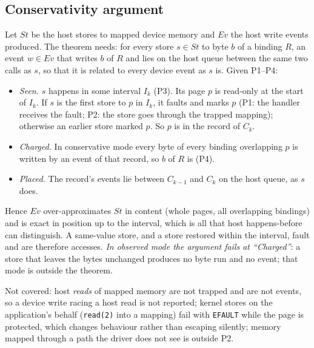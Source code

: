 \documentclass[acmtog,anonymous,review]{acmart}
\newcommand{\code}[1]{\texttt{#1}}
\begin{document}
\subsection{Conservativity argument}
Let $\mathit{St}$ be the host stores to mapped device memory and $\mathit{Ev}$ the host write events produced. The
theorem needs: for every store $s \in \mathit{St}$ to byte $b$ of a binding $R$, an event $w \in \mathit{Ev}$ that writes
$b$ of $R$ and lies on the host queue between the same two calls as $s$, so that it is related to every device event as
$s$ is. Given P1--P4:
\begin{itemize}
\item \emph{Seen.} $s$ happens in some interval $I_k$ (P3). Its page $p$ is read-only at the start of $I_k$. If $s$ is
  the first store to $p$ in $I_k$, it faults and marks $p$ (P1: the handler receives the fault; P2: the store goes
  through the trapped mapping); otherwise an earlier store marked $p$. So $p$ is in the record of $C_k$.
\item \emph{Charged.} In conservative mode every byte of every binding overlapping $p$ is written by an event of that
  record, so $b$ of $R$ is (P4).
\item \emph{Placed.} The record's events lie between $C_{k-1}$ and $C_k$ on the host queue, as $s$ does.
\end{itemize}
Hence $\mathit{Ev}$ over-approximates $\mathit{St}$ in content (whole pages, all overlapping bindings) and is exact in
position up to the interval, which is all that host happens-before can distinguish. A same-value store, and a store
restored within the interval, fault and are therefore accesses. \emph{In observed mode the argument fails at
``Charged''}: a store that leaves the bytes unchanged produces no byte run and no event; that mode is outside the
theorem.

Not covered: host \emph{reads} of mapped memory are not trapped and are not events, so a device write racing a host
read is not reported; kernel stores on the application's behalf (\code{read(2)} into a mapping) fail with
\code{EFAULT} while the page is protected, which changes behaviour rather than escaping silently; memory mapped through
a path the driver does not see is outside P2.
\end{document}
